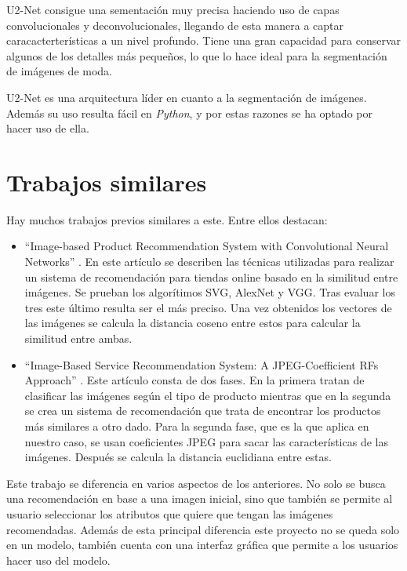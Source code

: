 \documentclass[12pt]{report} %
\begin{document}
	U2-Net consigue una sementación muy precisa haciendo uso de capas convolucionales y deconvolucionales, llegando de esta manera
	a captar caracacterterísticas a un nivel profundo. Tiene una gran capacidad para conservar algunos de los detalles más pequeños,
	lo que lo hace ideal para la segmentación de imágenes de moda. 


	U2-Net es una arquitectura líder en cuanto a la segmentación de imágenes. Además su uso resulta fácil en \textit{Python}, y
	por estas razones se ha optado por hacer uso de ella.


	\section{Trabajos similares}
	Hay muchos trabajos previos similares a este. Entre ellos destacan:
	\begin{itemize}
		\item ``Image-based Product Recommendation System with Convolutional Neural
		Networks'' \cite{stanford-paper}. En este artículo se describen las técnicas utilizadas para realizar un sistema de recomendación
		para tiendas online basado en la similitud entre imágenes. Se prueban los algorítimos SVG, AlexNet y VGG. Tras evaluar los tres
		este último resulta ser el más preciso. Una vez obtenidos los vectores de las imágenes se calcula la distancia coseno entre estos
		para calcular la similitud entre ambas.
		\item ``Image-Based Service Recommendation System: A JPEG-Coefficient RFs Approach'' \cite{image-based-paper}. 
		Este artículo consta de dos fases. En la primera tratan de clasificar las imágenes según el tipo de producto mientras 
		que en la segunda se crea un sistema de recomendación que trata de encontrar los productos más similares a otro dado. 
		Para la segunda fase, que es la que aplica en nuestro caso, se usan coeficientes JPEG para sacar las 
		características de las imágenes. Después se calcula la distancia euclidiana entre estas.
	\end{itemize}

	Este trabajo se diferencia en varios aspectos de los anteriores. No solo se busca una recomendación en base a una imagen inicial,
	sino que también se permite al usuario seleccionar los atributos que quiere que tengan las imágenes recomendadas. Además de esta
	principal diferencia este proyecto no se queda solo en un modelo, también
	cuenta con una interfaz gráfica que permite a los usuarios hacer uso del modelo.
\end{document}
